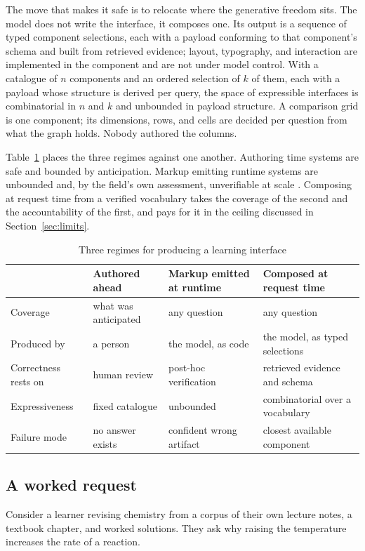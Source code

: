 \documentclass[conference]{IEEEtran}
\newcommand{\tbl}{\footnotesize}
\begin{document}
The move that makes it safe is to relocate where the generative freedom sits. The model does not write the interface, it composes one. Its output is a sequence of typed component selections, each with a payload conforming to that component's schema and built from retrieved evidence; layout, typography, and interaction are implemented in the component and are not under model control. With a catalogue of $n$ components and an ordered selection of $k$ of them, each with a payload whose structure is derived per query, the space of expressible interfaces is combinatorial in $n$ and $k$ and unbounded in payload structure. A comparison grid is one component; its dimensions, rows, and cells are decided per question from what the graph holds. Nobody authored the columns.

Table~\ref{tab:regimes} places the three regimes against one another. Authoring time systems are safe and bounded by anticipation. Markup emitting runtime systems are unbounded and, by the field's own assessment, unverifiable at scale \cite{ref:neshaei}. Composing at request time from a verified vocabulary takes the coverage of the second and the accountability of the first, and pays for it in the ceiling discussed in Section~\ref{sec:limits}.
\begin{table}[t]
\caption{Three regimes for producing a learning interface}
\label{tab:regimes}
\centering
\tbl
\begin{tabular}{@{}p{}p{}p{}p{}@{}}
\toprule
& \textbf{Authored ahead} & \textbf{Markup emitted at runtime} & \textbf{Composed at request time} \\
\midrule
Coverage & what was anticipated & any question & any question \\
Produced by & a person & the model, as code & the model, as typed selections \\
Correctness rests on & human review & post-hoc verification & retrieved evidence and schema \\
Expressiveness & fixed catalogue & unbounded & combinatorial over a vocabulary \\
Failure mode & no answer exists & confident wrong artifact & closest available component \\
\bottomrule
\end{tabular}
\end{table}

\subsection{A worked request}
\label{sec:worked}
Consider a learner revising chemistry from a corpus of their own lecture notes, a textbook chapter, and worked solutions. They ask why raising the temperature increases the rate of a reaction.
\end{document}
